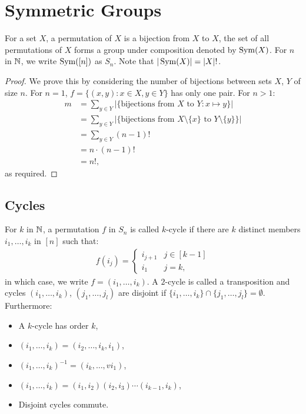 \section{Symmetric Groups}

For a set $X$, a permutation of $X$ is a bijection from $X$ to $X$,
the set of all permutations of $X$ forms a group under composition
denoted by $\operatorname{Sym}(X)$. For $n$ in $\mathbb{N}$, we write $\operatorname{Sym}([n])$ as $S_n$.
Note that $|\operatorname{Sym}(X)| = |X|!$.

\begin{proof}
    We prove this by considering the number of bijections between sets
    $X$, $Y$ of size $n$. For $n = 1$, $f = \{(x, y) : x \in X, y \in Y\}$
    has only one pair. For $n > 1$: \begin{align*}
        m 
        &= \sum_{y \in Y} |\{\text{bijections from } X \text{ to } Y 
            : x \mapsto y\}| \\
        &= \sum_{y \in Y} |\{\text{bijections from } X \setminus \{x\} 
            \text{ to } Y \setminus \{y\}\}| \\
        &= \sum_{y \in Y} (n - 1)! \\
        &= n \cdot (n - 1)! \\
        &= n!,
    \end{align*} as required.
\end{proof}

\subsection{Cycles}

For $k$ in $\mathbb{N}$, a permutation $f$ in $S_n$ is called $k$-cycle if
there are $k$ distinct members $i_1, \ldots, i_k$ in $[n]$ such that:
\begin{align*}
    f(i_j) = \begin{cases}
        i_{j + 1} & j \in [k - 1] \\
        i_1 & j = k,
    \end{cases}
\end{align*} in which case, we write $f = (i_1, \ldots, i_k)$.
A $2$-cycle is called a transposition and cycles 
$(i_1, \ldots, i_k)$, $(j_1, \ldots, j_l)$
are disjoint if $\{i_1, \ldots, i_k\} \cap \{j_1, \ldots, j_l\} = \emptyset$.
Furthermore: \begin{itemize}
    \item A $k$-cycle has order $k$,
    \item $(i_1, \ldots, i_k) = (i_2, \ldots, i_k, i_1)$,
    \item $(i_1, \ldots, i_k)^{-1} = (i_k, \ldots,v i_1)$,
    \item $(i_1, \ldots, i_k) = (i_1, i_2)(i_2, i_3) \cdots (i_{k - 1}, i_k)$,
    \item Disjoint cycles commute.
\end{itemize} 

